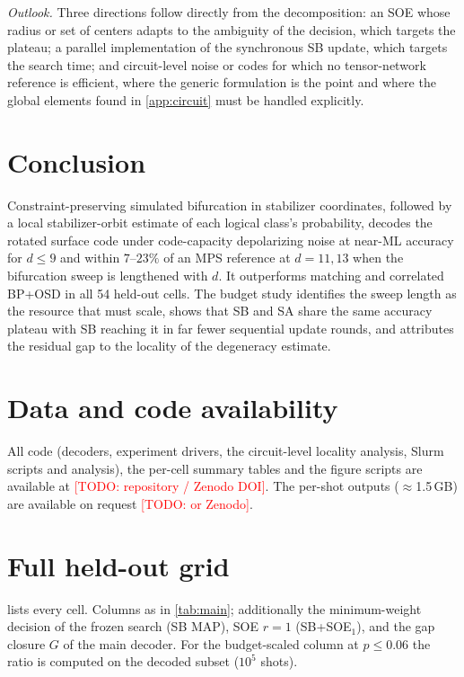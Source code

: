 \documentclass[journal]{IEEEtran}
\newcommand{\todo}[1]{\textcolor{red}{[TODO: #1]}}
\begin{document}
\emph{Outlook.} Three directions follow directly from the decomposition: an SOE whose radius or set of centers adapts to the ambiguity of the decision, which targets the plateau; a parallel implementation of the synchronous SB update, which targets the search time; and circuit-level noise or codes for which no tensor-network reference is efficient, where the generic formulation is the point and where the global elements found in \cref{app:circuit} must be handled explicitly.

\section{Conclusion}
\label{sec:conclusion}
Constraint-preserving simulated bifurcation in stabilizer coordinates, followed by a local stabilizer-orbit estimate of each logical class's probability, decodes the rotated surface code under code-capacity depolarizing noise at near-ML accuracy for $d\le9$ and within $7$--$23\%$ of an MPS reference at $d=11,13$ when the bifurcation sweep is lengthened with $d$. It outperforms matching and correlated BP+OSD in all 54 held-out cells. The budget study identifies the sweep length as the resource that must scale, shows that SB and SA share the same accuracy plateau with SB reaching it in far fewer sequential update rounds, and attributes the residual gap to the locality of the degeneracy estimate.

\section*{Data and code availability}
All code (decoders, experiment drivers, the circuit-level locality analysis, Slurm scripts and analysis), the per-cell summary tables and the figure scripts are available at \todo{repository / Zenodo DOI}. The per-shot outputs ($\approx$1.5\,GB) are available on request \todo{or Zenodo}.

\appendices
\section{Full held-out grid}
\label{app:table}
 lists every cell. Columns as in \cref{tab:main}; additionally the minimum-weight decision of the frozen search (SB MAP), SOE $r=1$ (SB+SOE$_1$), and the gap closure $G$ of the main decoder. For the budget-scaled column at $p\le0.06$ the ratio is computed on the decoded subset ($10^5$ shots).
\end{document}
